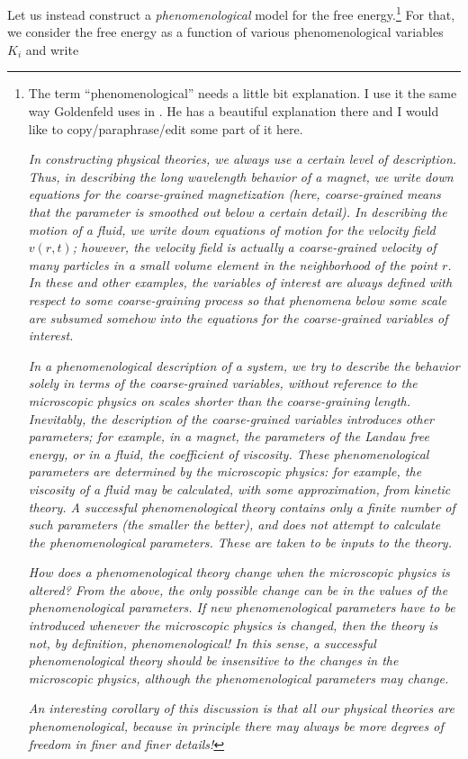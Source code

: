 Let us instead construct a \emph{phenomenological} model for the free energy.\footnote{The term ``phenomenological'' needs a little bit explanation. I use it the same way Goldenfeld uses in \cite{Goldenfeld:1992qy}. He has a beautiful explanation there and I would like to copy/paraphrase/edit some part of it here.
	
	\emph{In constructing physical theories, we always use a certain level of description. Thus, in describing the long wavelength behavior of a magnet, we write down equations for the coarse-grained magnetization (here, coarse-grained means that the parameter is smoothed out below a certain detail). In describing the motion of a fluid, we write down equations of motion for the velocity field $v(r,t)$; however, the velocity field is actually a coarse-grained velocity of many particles in a small volume element in the neighborhood of the point $r$. In these and other examples, the variables of interest are always defined with respect to some coarse-graining process so that phenomena below some scale are subsumed somehow into the equations for the coarse-grained variables of interest. }
	
	\emph{In a phenomenological description of a system, we try to describe the behavior solely in terms of the coarse-grained variables, without reference to the microscopic physics on scales shorter than the coarse-graining length. Inevitably, the description of the coarse-grained variables introduces other parameters; for example, in a magnet, the parameters of the Landau free energy, or in a fluid, the coefficient of viscosity. These phenomenological parameters are determined by the microscopic physics: for example, the viscosity of a fluid may be calculated, with some approximation, from kinetic theory. A successful phenomenological theory contains only a finite number of such parameters (the smaller the better), and does not attempt to calculate the phenomenological parameters. These are taken to be inputs to the theory.}
	
	\emph{How does a phenomenological theory change when the microscopic physics is altered? From the above, the only possible change can be in the values of the phenomenological parameters. If new phenomenological parameters have to be introduced whenever the microscopic physics is changed, then the theory is not, by definition, phenomenological! In this sense, a successful phenomenological theory should be insensitive to the changes in the microscopic physics, although the phenomenological parameters may change.
	}
	
	\emph{An interesting corollary of this discussion is that all our physical theories are phenomenological, because in principle there may always be more degrees of freedom in finer and finer details!}} For that, we consider the free energy as a function of various phenomenological variables $K_i$ and write
